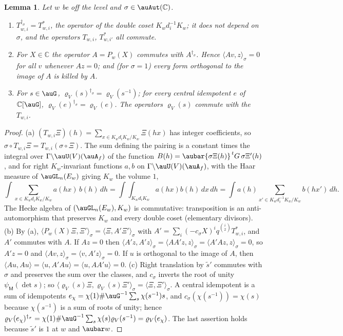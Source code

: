 \documentclass[10pt]{amsart}
\newtheorem{lemma}[theorem]{Lemma}
\theoremstyle{definition}
\theoremstyle{remark}
\newcommand{\C}{\mathbb C}
\begin{document}
\begin{lemma}\label{po:adj}
Let $w$ be off the level and $\sigma\in\auAut(\C)$.
\begin{enumerate}
\item[(a)] $T_{w,i}^{\dagger_\sigma}=T^*_{w,i}$, the operator of the double coset
$K_wd_i^{-1}K_w$; it does not depend on $\sigma$, and the operators $T_{w,i}$, $T^*_{w,i'}$ all
commute.
\item[(b)] For $X\in\C$ the operator $A=P_w(X)$ commutes with $A^{\dagger_\sigma}$. Hence
$\langle Av,z\rangle_\sigma=0$ for all $v$ whenever $Az=0$; and (for $\sigma=1$) every form
orthogonal to the image of $A$ is killed by $A$.
\item[(c)] For $s\in\auG$, $\varrho_V(s)^{\dagger_\sigma}=\varrho_V(s^{-1})$; for every central
idempotent $e$ of $\C[\auG]$, $\varrho_V(e)^{\dagger_\sigma}=\varrho_V(e)$. The operators
$\varrho_V(s)$ commute with the $T_{w,i}$.
\end{enumerate}
\end{lemma}
\begin{proof}
(a) $(T_{w,i}\Xi)(h)=\sum_{x\in K_wd_iK_w/K_w}\Xi(hx)$ has integer coefficients, so $\sigma\circ
T_{w,i}\Xi=T_{w,i}(\sigma\circ\Xi)$. The sum defining the pairing is a constant times the integral
over $\Gamma\backslash\auU(V)(\auA_f)$ of the function $B(h)=\aubar{\sigma\Xi(h)}^{\,t}G\,
\sigma\Xi'(h)$, and for right $K_w$-invariant functions $a,b$ on $\Gamma\backslash\auU(V)(\auA_f)$,
with the Haar measure of $\auGL_n(E_w)$ giving $K_w$ the volume $1$,
\[
\int\sum_{x\in K_wd_iK_w/K_w}a(hx)\,b(h)\,dh=\int\!\!\int_{K_wd_iK_w}a(hx)b(h)\,dx\,dh=
\int a(h)\sum_{x'\in K_wd_i^{-1}K_w/K_w}b(hx')\,dh .
\]
The Hecke algebra of $(\auGL_n(E_w),K_w)$ is commutative: transposition is an anti-automorphism
that preserves $K_w$ and every double coset (elementary divisors).
(b) By (a), $\langle P_w(X)\Xi,\Xi'\rangle_\sigma=\langle\Xi,A'\Xi'\rangle_\sigma$ with
$A'=\sum_i(-c_\sigma X)^iq^{\binom i2}T^*_{w,i}$, and $A'$ commutes with $A$. If $Az=0$ then
$\langle A'z,A'z\rangle_\sigma=\langle AA'z,z\rangle_\sigma=\langle A'Az,z\rangle_\sigma=0$, so
$A'z=0$ and $\langle Av,z\rangle_\sigma=\langle v,A'z\rangle_\sigma=0$. If $u$ is orthogonal to
the image of $A$, then $\langle Au,Au\rangle=\langle u,A'Au\rangle=\langle u,AA'u\rangle=0$.
(c) Right translation by $\tilde s'$ commutes with $\sigma$ and preserves the sum over the
classes, and $c_\sigma$ inverts the root of unity $\psi_{\mathsf M}(\det s)$; so $\langle\varrho_V(s)\Xi,\varrho_V(s)\Xi'\rangle_\sigma=\langle\Xi,\Xi'\rangle_\sigma$.
A central idempotent is a sum of idempotents $e_\chi=\chi(1)\#\auG^{-1}\sum_s\chi(s^{-1})s$, and
$c_\sigma(\chi(s^{-1}))=\chi(s)$ because $\chi(s^{-1})$ is a sum of roots of unity; hence
$\varrho_V(e_\chi)^{\dagger_\sigma}=\chi(1)\#\auG^{-1}\sum_s\chi(s)\varrho_V(s^{-1})=
\varrho_V(e_\chi)$. The last assertion holds because $\tilde s'$ is $1$ at $w$ and $\aubar w$.
\end{proof}
\end{document}
